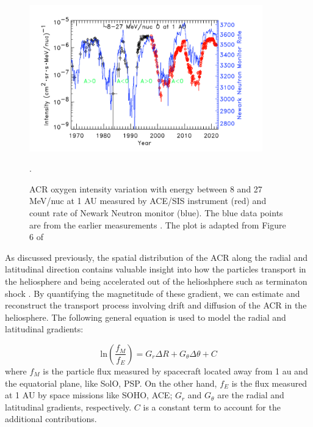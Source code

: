

\begin{figure}
	\centering
	\includegraphics[width = 0.9\textwidth]{images/ACR_solarmodulation.png}
	\caption[Long term variation of \ac{ACR} oxygen and neutron monitor count rate]{ACR oxygen intensity variation with energy between 8 and 27 MeV/nuc at 1 AU measured by ACE/SIS instrument (red) and count rate of Newark Neutron monitor (blue). The blue data points are from the earlier measurements \citep{Mewaldt1993GeoRL}. The plot is adapted from Figure 6 of \citet{Giacalone2022SSRv}}.
	\label{Fig:ACR_solarmodulation}
\end{figure}


As discussed previously, the spatial distribution of the \ac{ACR} along the radial and latitudinal direction contains valuable insight into how the particles transport in the heliosphere and being accelerated out of the helioshphere such as terminaton shock \citep{Rankin2021ApJ}. By quantifying the magnetitude of these gradient, we can estimate and reconstruct the transport process involving drift and diffusion of the \ac{ACR} in the heliosphere. The following general equation is used to model the radial and latitudinal gradients:

\begin{equation}
	\mathrm{ln}(\frac{f_{M}}{f_{E}}) = G_r \Delta R  + G_{\theta} \Delta \theta + C
\end{equation}
where $f_{M}$ is the particle flux measured by spacecraft located away from 1 au and the equatorial plane, like \ac{SolO}, \ac{PSP}. On the other hand, $f_{E}$ is the flux measured at 1 AU by space missions like \ac{SOHO}, \ac{ACE}; $G_r$ and $G_{\theta}$ are the radial and latitudinal gradients, respectively. $C$ is a constant term to account for the additional contributions.

